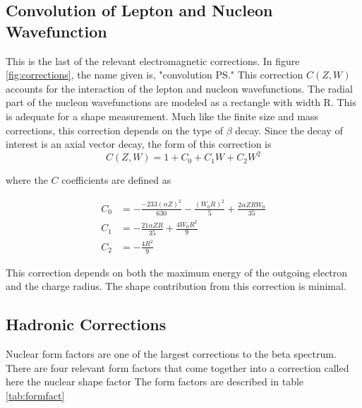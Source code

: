 \documentclass[../MaxHughesThesis.tex]{subfiles}
\begin{document}
\subsection{Convolution of Lepton and Nucleon Wavefunction}

This is the last of the relevant electromagnetic corrections.
In figure \ref{fig:corrections}, the name given is, "convolution PS."
This correction $C(Z,W)$ accounts for the interaction of the lepton and nucleon wavefunctions. 
The radial part of the nucleon wavefunctions are modeled as a rectangle with width R.
This is adequate for a shape measurement. 
Much like the finite size and mass corrections, this correction depends on the type of $\beta$ decay.
Since the decay of interest is an axial vector decay, the form of this correction is %
\begin{equation}
	C(Z,W) = 1 + C_{0} + C_{1} W + C_{2} W^{2}
	\label{eq:nucandlepconv}
\end{equation}

where the $C$ coefficients are defined as \cite{WIL90} %

\begin{equation}
	\label{eq:csconvocorrection}
	\begin{split}
	C_{0} & = -\frac{-233(\alpha Z)^{2}}{630} - \frac{(W_{0} R)^{2}}{5} + \frac{2 \alpha Z R W_{0}}{35} \\
	C_{1} & = -\frac{21 \alpha Z R}{35} + \frac{4 W_{0} R^{2}}{9} \\
	C_{2} & = -\frac{4 R^{2}}{9}
	\end{split}
\end{equation}

This correction depends on both the maximum energy of the outgoing electron and the charge radius.
The shape contribution from this correction is minimal. 

\subsection{Hadronic Corrections}

Nuclear form factors are one of the largest corrections to the beta spectrum.
There are four relevant form factors that come together into a correction called here the nuclear shape factor
The form factors are described in table \ref{tab:formfact} \cite{Min11} \cite{Cal77}

\begin{table}[!hbt]
	\centering
	\caption{Nuclear Form Factors}
	\label{tab:formfact}
\end{table}
\end{document}
